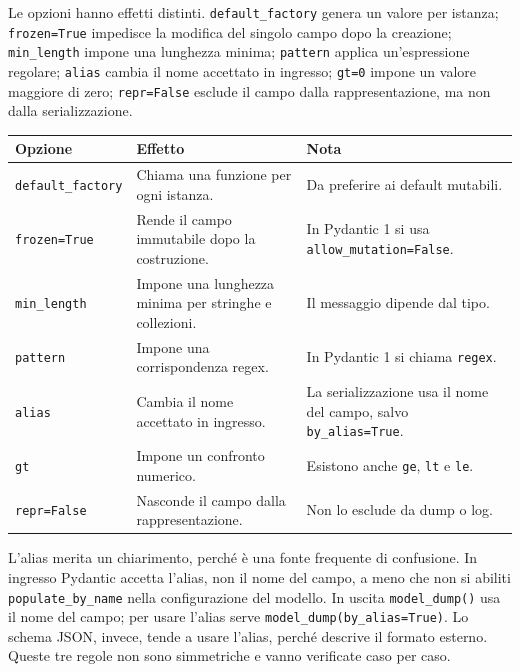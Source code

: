 \documentclass[12pt]{extarticle}
\begin{document}
\noindent Le opzioni hanno effetti distinti. \texttt{default\_factory} genera un valore per istanza; \texttt{frozen=True} impedisce la modifica del singolo campo dopo la creazione; \texttt{min\_length} impone una lunghezza minima; \texttt{pattern} applica un'espressione regolare; \texttt{alias} cambia il nome accettato in ingresso; \texttt{gt=0} impone un valore maggiore di zero; \texttt{repr=False} esclude il campo dalla rappresentazione, ma non dalla serializzazione.

\begin{center}
\small
\begin{tabular}{p{3.8cm}p{6.0cm}p{5.8cm}}
    \toprule
    \textbf{Opzione} & \textbf{Effetto} & \textbf{Nota} \\
    \midrule
    \texttt{default\_factory} & Chiama una funzione per ogni istanza. & Da preferire ai default mutabili. \\
    \addlinespace
    \texttt{frozen=True} & Rende il campo immutabile dopo la costruzione. & In Pydantic 1 si usa \texttt{allow\_mutation=False}. \\
    \addlinespace
    \texttt{min\_length} & Impone una lunghezza minima per stringhe e collezioni. & Il messaggio dipende dal tipo. \\
    \addlinespace
    \texttt{pattern} & Impone una corrispondenza regex. & In Pydantic 1 si chiama \texttt{regex}. \\
    \addlinespace
    \texttt{alias} & Cambia il nome accettato in ingresso. & La serializzazione usa il nome del campo, salvo \texttt{by\_alias=True}. \\
    \addlinespace
    \texttt{gt} & Impone un confronto numerico. & Esistono anche \texttt{ge}, \texttt{lt} e \texttt{le}. \\
    \addlinespace
    \texttt{repr=False} & Nasconde il campo dalla rappresentazione. & Non lo esclude da dump o log. \\
    \bottomrule
\end{tabular}
\end{center}

\noindent L'alias merita un chiarimento, perché è una fonte frequente di confusione. In ingresso Pydantic accetta l'alias, non il nome del campo, a meno che non si abiliti \texttt{populate\_by\_name} nella configurazione del modello. In uscita \texttt{model\_dump()} usa il nome del campo; per usare l'alias serve \texttt{model\_dump(by\_alias=True)}. Lo schema JSON, invece, tende a usare l'alias, perché descrive il formato esterno. Queste tre regole non sono simmetriche e vanno verificate caso per caso.
\end{document}
